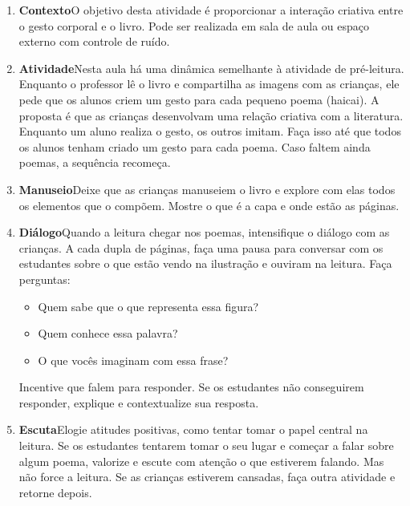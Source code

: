 \documentclass[11pt]{extarticle}
\begin{document}
\begin{enumerate}
\item \textbf{Contexto}\quad O objetivo desta atividade é proporcionar a interação criativa entre o gesto corporal e o livro. Pode ser realizada em sala de aula ou espaço externo com controle de ruído.
 
\item \textbf{Atividade}\quad Nesta aula há uma dinâmica semelhante à atividade de pré-leitura. Enquanto o professor lê o livro e compartilha as imagens com as crianças, ele pede que os alunos criem um gesto para cada pequeno poema (haicai). A proposta é que as crianças desenvolvam uma relação criativa com a literatura. Enquanto um aluno realiza o gesto, os outros imitam. Faça isso até que todos os alunos tenham criado um gesto para cada poema. Caso faltem ainda poemas, a sequência recomeça.    

\item \textbf{Manuseio}\quad Deixe que as crianças manuseiem o livro 
e explore com elas todos os elementos que o compõem. Mostre o que é a 
capa e onde estão as páginas.

\item \textbf{Diálogo}\quad Quando a leitura chegar nos poemas, 
intensifique o diálogo com as crianças. A cada dupla de páginas, faça uma 
pausa para conversar com os estudantes sobre o que estão vendo na ilustração e ouviram na leitura. Faça perguntas: 

\begin{itemize}
\item Quem sabe que o que representa essa figura?
\item Quem conhece essa palavra?
\item O que vocês imaginam com essa frase?
\end{itemize}


Incentive que falem para responder. Se os estudantes não 
conseguirem responder, explique e contextualize sua
resposta.

\item \textbf{Escuta}\quad Elogie atitudes positivas, como 
tentar tomar o papel central na leitura. Se os estudantes tentarem 
tomar o seu lugar e começar a falar sobre algum poema, valorize e escute com atenção o que estiverem falando. Mas não 
force a leitura. Se as crianças estiverem cansadas, faça outra atividade 
e retorne depois. 





\end{enumerate}
\end{document}

